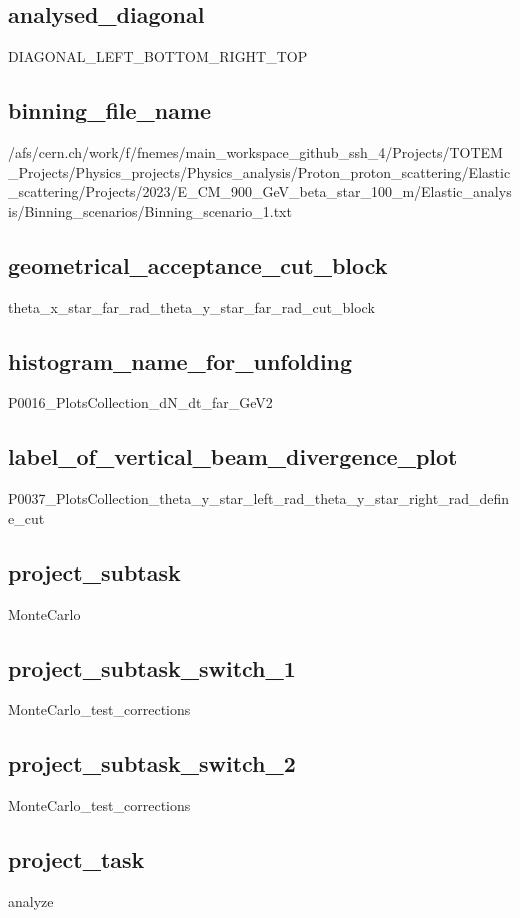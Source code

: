 \documentclass{article}
\begin{document}
\begin{landscape}
\subsection{analysed\_diagonal}
DIAGONAL\_LEFT\_BOTTOM\_RIGHT\_TOP \newline
\subsection{binning\_file\_name}
/afs/cern.ch/work/f/fnemes/main\_workspace\_github\_ssh\_4/Projects/TOTEM\_Projects/Physics\_projects/Physics\_analysis/Proton\_proton\_scattering/Elastic\_scattering/Projects/2023/E\_CM\_900\_GeV\_beta\_star\_100\_m/Elastic\_analysis/Binning\_scenarios/Binning\_scenario\_1.txt \newline
\subsection{geometrical\_acceptance\_cut\_block}
theta\_x\_star\_far\_rad\_theta\_y\_star\_far\_rad\_cut\_block \newline
\subsection{histogram\_name\_for\_unfolding}
P0016\_PlotsCollection\_dN\_dt\_far\_GeV2 \newline
\subsection{label\_of\_vertical\_beam\_divergence\_plot}
P0037\_PlotsCollection\_theta\_y\_star\_left\_rad\_theta\_y\_star\_right\_rad\_define\_cut \newline
\subsection{project\_subtask}
MonteCarlo \newline
\subsection{project\_subtask\_switch\_1}
MonteCarlo\_test\_corrections \newline
\subsection{project\_subtask\_switch\_2}
MonteCarlo\_test\_corrections \newline
\subsection{project\_task}
analyze \newline

\end{landscape}
\end{document}
